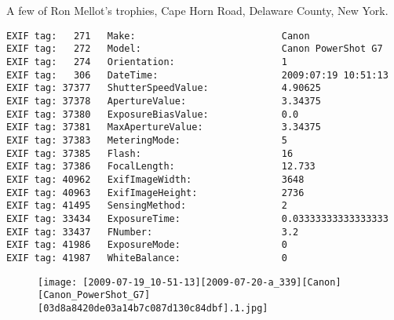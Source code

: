 \section{\protect{}}
\noindent A few of Ron Mellot's trophies, Cape Horn Road, Delaware County, New York.
\noindent
\begin{lstlisting}
EXIF tag:   271   Make:                          Canon
EXIF tag:   272   Model:                         Canon PowerShot G7
EXIF tag:   274   Orientation:                   1
EXIF tag:   306   DateTime:                      2009:07:19 10:51:13
EXIF tag: 37377   ShutterSpeedValue:             4.90625
EXIF tag: 37378   ApertureValue:                 3.34375
EXIF tag: 37380   ExposureBiasValue:             0.0
EXIF tag: 37381   MaxApertureValue:              3.34375
EXIF tag: 37383   MeteringMode:                  5
EXIF tag: 37385   Flash:                         16
EXIF tag: 37386   FocalLength:                   12.733
EXIF tag: 40962   ExifImageWidth:                3648
EXIF tag: 40963   ExifImageHeight:               2736
EXIF tag: 41495   SensingMethod:                 2
EXIF tag: 33434   ExposureTime:                  0.03333333333333333
EXIF tag: 33437   FNumber:                       3.2
EXIF tag: 41986   ExposureMode:                  0
EXIF tag: 41987   WhiteBalance:                  0

\end{lstlisting}
\clearpage
\begin{figure}
\raggedleft
\texttt{[image: [2009-07-19\_10-51-13][2009-07-20-a\_339][Canon][Canon\_PowerShot\_G7][03d8a8420de03a14b7c087d130c84dbf].1.jpg]}
\end{figure}


\clearpage
